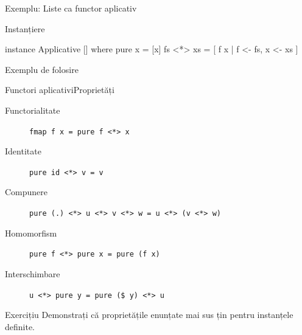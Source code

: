 \documentclass[xcolor=pdftex,romanian,colorlinks]{beamer}
\begin{document}
\begin{frame}[fragile]{Exemplu: Liste ca functor aplicativ}
\begin{block}{Instanțiere}
\vspace{-1.5ex}
\begin{asciihs}
instance Applicative [] where
  pure x            = [x]
  fs <*> xs         = [ f x | f <- fs, x <- xs ]
\end{asciihs}
\vspace{-1ex}
\end{block}
\begin{block}{Exemplu de folosire}
\vspace{-1.5ex}
\end{block}
\end{frame}

\begin{frame}[fragile]{Functori aplicativi}{Proprietăți}
\begin{description}
\item[Functorialitate]
    \lstinline$fmap f x = pure f <*> x$
\item[Identitate]

    \lstinline$pure id <*> v = v$

\item[Compunere]

    \lstinline$pure (.) <*> u <*> v <*> w = u <*> (v <*> w)$
    
    

\item[Homomorfism]

    \lstinline$pure f <*> pure x = pure (f x)$

\item[Interschimbare]

    \lstinline"u <*> pure y = pure ($ y) <*> u"
    
\end{description}

\begin{block}{Exercițiu}
Demonstrați că proprietățile enunțate mai sus țin pentru instanțele definite.
\end{block}
\end{frame}
\end{document}
